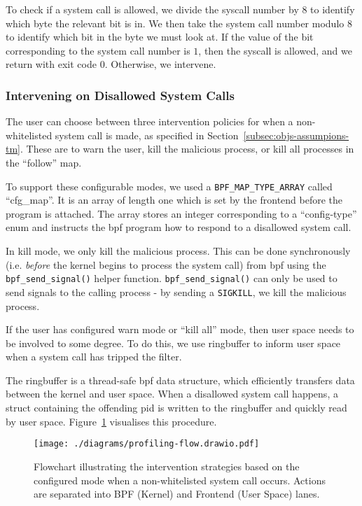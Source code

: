 To check if a system call is allowed, we divide the syscall number by 8 to identify  
which byte the relevant bit is in. We then take the system call number modulo 8 to
identify which bit in the byte we must look at. If the value of the bit
corresponding to the system call number is $1$, then the syscall is allowed, and we
return with exit code 0. Otherwise, we intervene.

\subsubsection{Intervening on Disallowed System Calls}\label{subsubsec:impl-intervening}

The user can choose between three intervention policies for when a
non-whitelisted system call is made, as specified in 
Section~\ref{subsec:objs-assumpions-tm}. These are to warn the user, kill the
malicious process, or kill all processes in the ``follow'' map.

To support these configurable modes, we used a \texttt{BPF\_MAP\_TYPE\_ARRAY}
called ``cfg\_map''. It is an array of length one which is set by the frontend
before the program is attached. The array stores an integer corresponding to
a ``config-type'' enum and instructs the \ac{bpf} program how to respond to a
disallowed system call.

In kill mode, we only kill the malicious process. This can be done synchronously
(i.e. \textit{before} the kernel begins to process the system call) from \ac{bpf}
using the \texttt{bpf\_send\_signal()} helper function. 
\texttt{bpf\_send\_signal()} can only be used to send signals to the calling
process - by sending a \texttt{SIGKILL}, we kill the malicious process.

If the user has configured warn mode or ``kill all'' mode, then user space needs
to be involved to some degree. To do this, we use  ringbuffer to inform
user space when a system call has tripped the filter. 

The ringbuffer is a thread-safe
\ac{bpf} data structure, which efficiently transfers data between the kernel and
user space. When a disallowed system call happens, a struct containing the offending \ac{pid} is written to the ringbuffer and quickly read by
user space. Figure~\ref{fig:intervention-flowchart} visualises this procedure.

\begin{figure}[h]
\centering
\texttt{[image: ./diagrams/profiling-flow.drawio.pdf]} 
\caption{Flowchart illustrating the intervention strategies based on the
configured mode when a non-whitelisted system call occurs. Actions are separated
into BPF (Kernel) and Frontend (User Space) lanes.}
\label{fig:intervention-flowchart}
\end{figure}

